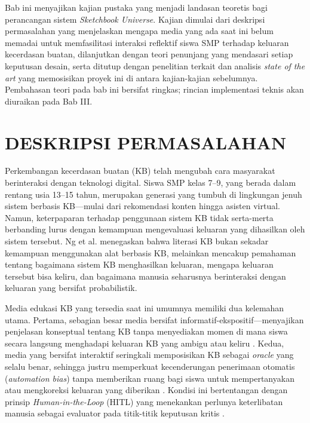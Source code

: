 \documentclass[12pt,a4paper,oneside,openany]{report}
\begin{document}
Bab ini menyajikan kajian pustaka yang menjadi landasan teoretis bagi perancangan sistem \textit{Sketchbook Universe}. Kajian dimulai dari deskripsi permasalahan yang menjelaskan mengapa media yang ada saat ini belum memadai untuk memfasilitasi interaksi reflektif siswa SMP terhadap keluaran kecerdasan buatan, dilanjutkan dengan teori penunjang yang mendasari setiap keputusan desain, serta ditutup dengan penelitian terkait dan analisis \textit{state of the art} yang memosisikan proyek ini di antara kajian-kajian sebelumnya. Pembahasan teori pada bab ini bersifat ringkas; rincian implementasi teknis akan diuraikan pada Bab III.

\section{DESKRIPSI PERMASALAHAN}
\label{sec:deskripsi-permasalahan}

Perkembangan kecerdasan buatan (KB) telah mengubah cara masyarakat berinteraksi dengan teknologi digital. Siswa SMP kelas 7--9, yang berada dalam rentang usia 13--15 tahun, merupakan generasi yang tumbuh di lingkungan jenuh sistem berbasis KB---mulai dari rekomendasi konten hingga asisten virtual. Namun, keterpaparan terhadap penggunaan sistem KB tidak serta-merta berbanding lurus dengan kemampuan mengevaluasi keluaran yang dihasilkan oleh sistem tersebut. Ng et al. \cite{ref1} menegaskan bahwa literasi KB bukan sekadar kemampuan menggunakan alat berbasis KB, melainkan mencakup pemahaman tentang bagaimana sistem KB menghasilkan keluaran, mengapa keluaran tersebut bisa keliru, dan bagaimana manusia seharusnya berinteraksi dengan keluaran yang bersifat probabilistik.

Media edukasi KB yang tersedia saat ini umumnya memiliki dua kelemahan utama. Pertama, sebagian besar media bersifat informatif-ekspositif---menyajikan penjelasan konseptual tentang KB tanpa menyediakan momen di mana siswa secara langsung menghadapi keluaran KB yang ambigu atau keliru \cite{ref2}. Kedua, media yang bersifat interaktif seringkali memposisikan KB sebagai \textit{oracle} yang selalu benar, sehingga justru memperkuat kecenderungan penerimaan otomatis (\textit{automation bias}) tanpa memberikan ruang bagi siswa untuk mempertanyakan atau mengkoreksi keluaran yang diberikan \cite{ref4}\cite{ref5}. Kondisi ini bertentangan dengan prinsip \textit{Human-in-the-Loop} (HITL) yang menekankan perlunya keterlibatan manusia sebagai evaluator pada titik-titik keputusan kritis \cite{ref4}.
\end{document}

